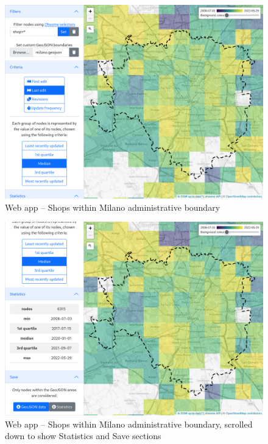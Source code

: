 \documentclass{Configuration_Files/PoliMi3i_thesis}
\begin{document}
\begin{figure}[ht]
    \centering
    \includegraphics[width=1\textwidth]{Images/level12_milano_geojson_shops.png}
    \caption{Web app – Shops within Milano administrative boundary}
    \label{fig:level12_milano_geojson_shops}
\end{figure}

\begin{figure}[ht]
    \centering
    \includegraphics[width=1\textwidth]{Images/level12_milano_geojson_shops_scroll.png}
    \caption[Web app – Shops within Milano administrative boundary, scrolled down]{Web app – Shops within Milano administrative boundary, scrolled down to show Statistics and Save sections}
    \label{fig:level12_milano_geojson_shops_scroll}
\end{figure}
\end{document}
